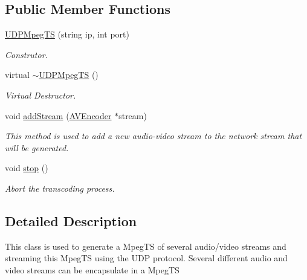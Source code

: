 \subsection*{Public Member Functions}
\begin{DoxyCompactItemize}
\item 
\hyperlink{classbr_1_1ufscar_1_1lince_1_1xpta_1_1streaming_1_1UDPMpegTS_a8310650ac588f6a5a279cf326cab106a}{UDPMpegTS} (string ip, int port)
\begin{DoxyCompactList}\small\item\em Construtor. \item\end{DoxyCompactList}\item 
virtual \hyperlink{classbr_1_1ufscar_1_1lince_1_1xpta_1_1streaming_1_1UDPMpegTS_a1fc39a40dcc5bf34200c44c0b271925a}{$\sim$UDPMpegTS} ()
\begin{DoxyCompactList}\small\item\em Virtual Destructor. \item\end{DoxyCompactList}\item 
void \hyperlink{classbr_1_1ufscar_1_1lince_1_1xpta_1_1streaming_1_1UDPMpegTS_aee9409fecaba631e3b20358ad4b301fe}{addStream} (\hyperlink{classbr_1_1ufscar_1_1lince_1_1xpta_1_1streaming_1_1AVEncoder}{AVEncoder} $\ast$stream)
\begin{DoxyCompactList}\small\item\em This method is used to add a new audio-\/video stream to the network stream that will be generated. \item\end{DoxyCompactList}\item 
void \hyperlink{classbr_1_1ufscar_1_1lince_1_1xpta_1_1streaming_1_1UDPMpegTS_a93e9440df823daca067f260fcbac323f}{stop} ()
\begin{DoxyCompactList}\small\item\em Abort the transcoding process. \item\end{DoxyCompactList}\end{DoxyCompactItemize}


\subsection{Detailed Description}
This class is used to generate a MpegTS of several audio/video streams and streaming this MpegTS using the UDP protocol. Several different audio and video streams can be encapsulate in a MpegTS 

